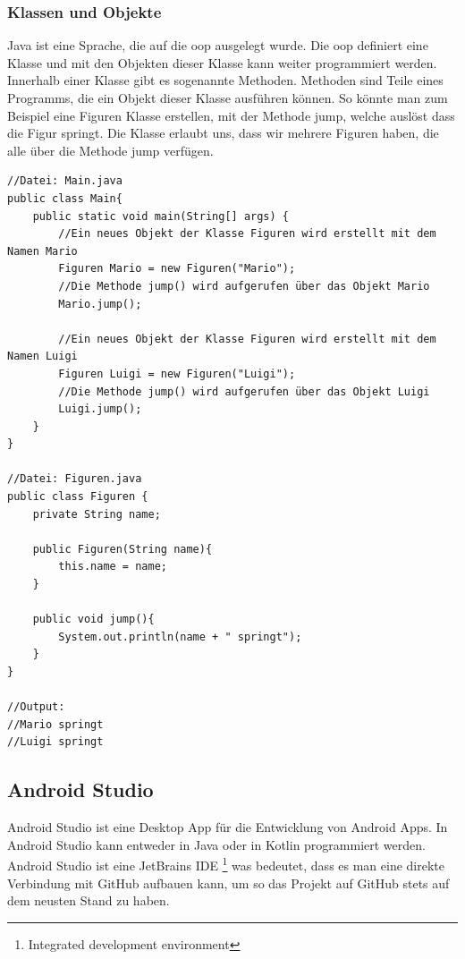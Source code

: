 \subsubsection{Klassen und Objekte}
Java ist eine Sprache, die auf die \gls{oop} ausgelegt wurde. Die \gls{oop} definiert eine Klasse und mit den Objekten dieser Klasse kann weiter programmiert werden. Innerhalb einer Klasse gibt es sogenannte Methoden. Methoden sind Teile eines Programms, die ein Objekt dieser Klasse ausführen können. So könnte man zum Beispiel eine Figuren Klasse erstellen, mit der Methode jump, welche auslöst dass die Figur springt. Die Klasse erlaubt uns, dass wir mehrere Figuren haben, die alle über die Methode jump verfügen.
\begin{verbatim}
//Datei: Main.java
public class Main{
    public static void main(String[] args) {
        //Ein neues Objekt der Klasse Figuren wird erstellt mit dem Namen Mario
        Figuren Mario = new Figuren("Mario");
        //Die Methode jump() wird aufgerufen über das Objekt Mario
        Mario.jump();

        //Ein neues Objekt der Klasse Figuren wird erstellt mit dem Namen Luigi
        Figuren Luigi = new Figuren("Luigi");
        //Die Methode jump() wird aufgerufen über das Objekt Luigi
        Luigi.jump();
    }
}

//Datei: Figuren.java
public class Figuren {
    private String name;

    public Figuren(String name){
        this.name = name;
    }

    public void jump(){
        System.out.println(name + " springt");
    }
}

//Output:
//Mario springt
//Luigi springt
\end{verbatim}

\subsection{Android Studio}
Android Studio ist eine Desktop App für die Entwicklung von Android Apps. In Android Studio kann entweder in Java oder in Kotlin programmiert werden. Android Studio ist eine JetBrains IDE \footnote{Integrated development environment} was bedeutet, dass es man eine direkte Verbindung mit GitHub aufbauen kann, um so das Projekt auf GitHub stets auf dem neusten Stand zu haben.

